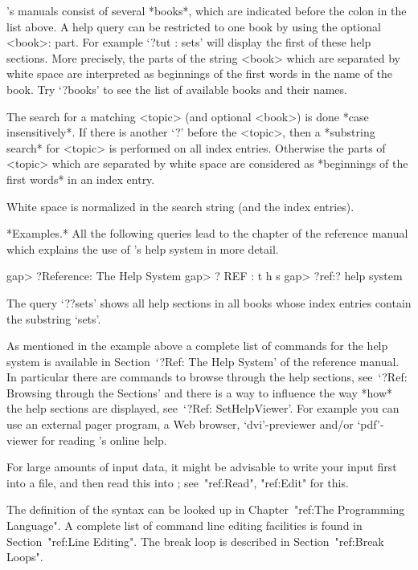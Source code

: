 {\GAP}'s manuals consist of several  *books*, which are indicated before the
colon in the list above. A help query can be restricted to one book by using
the optional <book>: part. For example  `?tut : sets' will display the first
of these help sections. More precisely, the parts of the string <book> which
are separated  by white  space are  interpreted as  beginnings of  the first
words in  the name of the  book. Try `?books'  to see the list  of available
books and their names.

The  search for  a  matching <topic>  (and optional  <book>)  is done  *case
insensitively*.  If  there  is  another  `?'  before  the  <topic>,  then  a
*substring search* for <topic> is  performed on all index entries. Otherwise
the parts  of <topic> which are  separated by white space  are considered as
*beginnings of the first words* in an index entry.

White space is normalized in the search string (and the index entries). 

*Examples.* All the  following queries lead to the chapter  of the reference
manual which explains the use of {\GAP}'s help system in more detail.

\begintt
gap> ?Reference: The Help System
gap> ?  REF : t h s
gap> ?ref:?  help   system 
\endtt

The query `??sets' shows all help  sections in all books whose index entries
contain the substring `sets'.

As mentioned in the  example above a complete list of  commands for the help
system  is available  in Section~`?Ref:  The Help  System' of  the reference
manual.  In  particular  there  are  commands to  browse  through  the  help
sections, see~`?Ref:  Browsing through the Sections'  and there is a  way to
influence  the  way  *how*  the  help  sections  are  displayed,  see~`?Ref:
SetHelpViewer'. For  example you can  use an  external pager program,  a Web
browser,  `dvi'-previewer and/or  `pdf'-viewer for  reading {\GAP}'s  online
help.


For large amounts of input data, it might be advisable to write your
input first into a file, and then read this into {\GAP};
see~"ref:Read", "ref:Edit" for this.

The definition of the {\GAP} syntax can be looked up in
Chapter~"ref:The Programming Language".
A complete list of command line editing facilities is found
in Section~"ref:Line Editing".
The break loop is described in Section~"ref:Break Loops".


